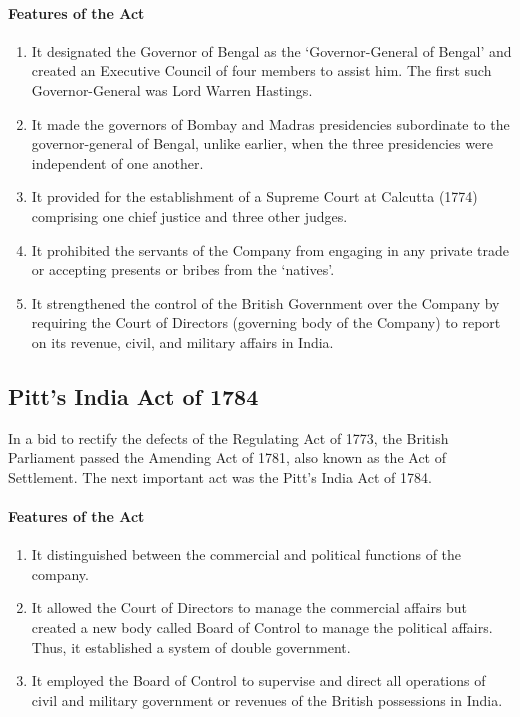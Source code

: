 \paragraph{Features of the Act}

\begin{enumerate}
  \item It designated the Governor of Bengal as the `Governor-General of Bengal' and created an Executive Council of four members to assist him. The first such Governor-General was Lord Warren Hastings.
  \item It made the governors of Bombay and Madras presidencies subordinate to the governor-general of Bengal, unlike earlier, when the three presidencies were independent of one another.
  \item It provided for the establishment of a Supreme Court at Calcutta (1774) comprising one chief justice and three other judges.
  \item It prohibited the servants of the Company from engaging in any private trade or accepting presents or bribes from the `natives'.
  \item It strengthened the control of the British Government over the Company by requiring the Court of Directors (governing body of the Company) to report on its revenue, civil, and military affairs in India.
\end{enumerate}

\subsection{Pitt's India Act of 1784}

In a bid to rectify the defects of the Regulating Act of 1773, the British Parliament passed the Amending Act of 1781, also known as the Act of Settlement. The next important act was the Pitt's India Act of 1784.

\paragraph{Features of the Act}
\begin{enumerate}
  \item It distinguished between the commercial and political functions of the company.
  \item It allowed the Court of Directors to manage the commercial affairs but created a new body called Board of Control to manage the political affairs. Thus, it established a system of double government.
  \item It employed the Board of Control to supervise and direct all operations of civil and military government or revenues of the British possessions in India.
\end{enumerate}


